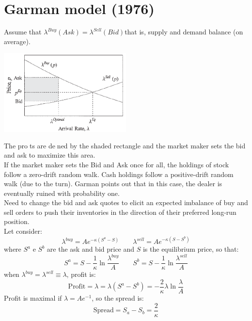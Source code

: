 \section{Garman model (1976)}
Assume that $\lambda^{Buy}(Ask) = \lambda^{Sell}(Bid)$that is, supply and demand balance (on average).
\begin{center}
	\includegraphics[width=0.5\textwidth]{picture/(23)bid_ask_garman.png}
\end{center}
The prots are dened by the shaded rectangle and the market maker sets the bid and ask to maximize this area.\\
If the market maker sets the Bid and Ask once for all, the holdings of stock follow a zero-drift random walk. Cash holdings follow a positive-drift random walk (due to the turn). Garman points out that in this case, the dealer is eventually ruined with probability one.\\
Need to change the bid and ask quotes to elicit an expected imbalance of buy and sell orders to push their inventories in the direction of their preferred long-run position.\\
Let consider:
\[
\lambda^{buy} = Ae^{-\kappa(S^a-S)} \qquad \lambda^{sell} = Ae^{-\kappa(S-S^b)}
\]
where $S^a$ e $S^b$ are the ask and bid price and $S$ is the equilibrium price, so that:
\[
S^a = S - \frac{1}{\kappa} \ln \frac{\lambda^{buy}}{A} \qquad S^b = S - \frac{1}{\kappa} \ln \frac{\lambda^{sell}}{A}
\]
when $\lambda^{buy} = \lambda^{sell} \equiv \lambda$, profit is:
\[
\text{Profit} = \lambda = \lambda(S^a - S^b) = - \frac{2}{\kappa}\lambda \ln \frac{\lambda}{A}
\]
Profit is maximal if $\lambda = Ae^{-1}$, so the spread is:
\[
\text{Spread} = S_a - S_b = \frac{2}{\kappa}
\]
\newpage
